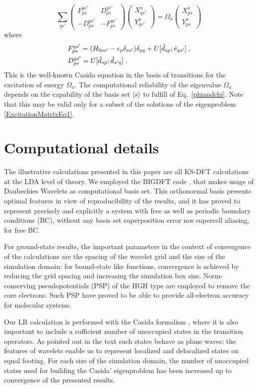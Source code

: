 \documentclass[reprint,aps,prb]{revtex4-1}
\newcommand{\eps}{\epsilon}
\newcommand{\be}{\begin{equation}}
\newcommand{\ee}{\end{equation}}
\newcommand{\nn}{\notag}
\newcommand{\lb}{\label}
\newcommand{\mat}[1]{\begin{pmatrix} #1\end{pmatrix}}
\newcommand{\op}[1]{\hat {#1}}
\newcommand{\excite}[2]{\op e_{{#1}{#2}}}
\newcommand{\decay}[2]{\op d_{{#1}{#2}}}
\begin{document}
\be\lb{ExcitationMatrixEq1}
\sum_{qs'}\mat{F_{ps}^{qs'} &  D_{ps}^{qs'}  \\
- D_{ps}^{qs'} & - F_{ps}^{qs'} }
\mat{X^a_{qs'} \\ Y^a_{qs'}} = \Omega_a \mat{X^a_{ps} \\ Y^a_{ps}}
\ee
where
\begin{align}
& F_{ps}^{qs'} = (H_{0 ss'}-\eps_p\delta_{ss'})\delta_{pq} + U[\decay{s}{p};\excite{q}{s'}] \;,\nn \\
& D_{ps}^{qs'} = U[\decay{s}{p};\decay{s'}{q}] \;.
\end{align}
This is the well-known Casida equation in the basis of transitions for the excitation of energy $\Omega_a$. The computational reliability of the
eigenvalue $\Omega_a$ depends on the capability of the basis set $\ket{s}$ to fulfill of Eq.~\eqref{phiandchi}. Note that this may be valid only for a subset of the solutions of the eigenproblem \eqref{ExcitationMatrixEq1}.

\section{Computational details} \lb{compdetails}
The illustrative calculations presented in this paper are all KS-DFT calculations at the LDA level of theory. We employed the BIGDFT code \cite{BigDFT},
that makes usage of Daubechies Wavelets as computational basis set. This orthonormal basis presents optimal features in view of reproducibility of the results, and it has proved to represent precisely and explicitly a system with free as well as periodic boundary conditions (BC), without any basis set superposition error nor supercell aliasing, for free BC.

For ground-state results, the important parameters in the context of convergence of the calculations are the spacing of the wavelet grid and the size of the simulation domain: for bound-state like functions, convergence is achieved by reducing the grid spacing and increasing the simulation box size.
Norm-conserving pseudopotentials (PSP) of the HGH \cite{NLCCPSP} type are employed to remove the core electrons. Such PSP have proved to be able to provide all-electron accuracy for molecular systems.

Our LR calculation is performed with the Casida formalism \cite{bhaarathi}, where it is also important to include a sufficient number of unoccupied states in the transition operators. As pointed out in the text such states behave as plane waves: the features of wavelets enable us to represent localized and delocalized states on equal footing.
For each size of the simulation domain, the number of unoccupied states used for building the Casida' eigenproblem has been increased up to convergence of the presented results.
\end{document}
